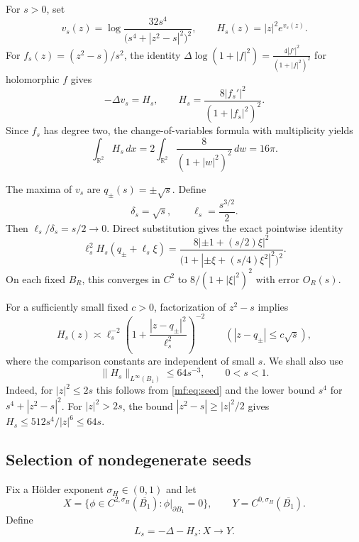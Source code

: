 \documentclass[11pt,reqno]{amsart}
\numberwithin{equation}{section}
\theoremstyle{definition}
\theoremstyle{remark}
\newcommand{\R}{\mathbb R}
\newcommand{\dd}{\,dx}
\begin{document}
For $s>0$, set
\begin{equation}\label{mf:eq:seed}
v_s(z)=\log\frac{32s^4}{\bigl(s^4+|z^2-s|^2\bigr)^2},
\qquad H_s(z)=|z|^2e^{v_s(z)}.
\end{equation}
For $f_s(z)=(z^2-s)/s^2$, the identity
\(\Delta\log(1+|f|^2)=\frac{4|f'|^2}{(1+|f|^2)^2}\)
for holomorphic $f$ gives
\begin{equation}\label{mf:eq:seedPDE}
-\Delta v_s=H_s,
\qquad H_s=\frac{8|f_s'|^2}{(1+|f_s|^2)^2}.
\end{equation}
Since $f_s$ has degree two, the change-of-variables formula with
multiplicity yields
\begin{equation}\label{mf:eq:totalmass}
\int_{\R^2}H_s\dd
=2\int_{\R^2}\frac8{(1+|w|^2)^2}\,dw=16\pi.
\end{equation}

The maxima of $v_s$ are $q_\pm(s)=\pm\sqrt{s}$. Define
\begin{equation}\label{mf:eq:scales}
\delta_s=\sqrt{s},\qquad \ell_s=\frac{s^{3/2}}2.
\end{equation}
Then $\ell_s/\delta_s=s/2\to0$. Direct substitution gives the exact
pointwise identity
\begin{equation}\label{mf:eq:exactcore}
\ell_s^2H_s(q_\pm+\ell_s\xi)
=\frac{8|\pm1+(s/2)\xi|^2}
{\bigl(1+|\pm\xi+(s/4)\xi^2|^2\bigr)^2}.
\end{equation}
On each fixed $B_R$, this converges in $C^2$ to
$8/(1+|\xi|^2)^2$ with error $O_R(s)$.

For a sufficiently small fixed $c>0$, factorization of $z^2-s$
implies
\begin{equation}\label{mf:eq:pointwise}
H_s(z)\asymp
\ell_s^{-2}\left(1+\frac{|z-q_\pm|^2}{\ell_s^2}\right)^{-2}
\qquad (|z-q_\pm|\le c\sqrt{s}),
\end{equation}
where the comparison constants are independent of small $s$.
We shall also use
\begin{equation}\label{mf:eq:supH}
\|H_s\|_{L^\infty(B_1)}\le64s^{-3},\qquad 0<s<1.
\end{equation}
Indeed, for $|z|^2\le2s$ this follows from \eqref{mf:eq:seed} and the
lower bound $s^4$ for $s^4+|z^2-s|^2$. For $|z|^2>2s$, the bound
$|z^2-s|\ge |z|^2/2$ gives $H_s\le512s^4/|z|^6\le64s$.

\subsection{Selection of nondegenerate seeds}

Fix a H\"older exponent $\sigma_H\in(0,1)$ and let
\[
X=\{\phi\in C^{2,\sigma_H}(\overline{B_1}):
\phi|_{\partial B_1}=0\},\qquad
Y=C^{0,\sigma_H}(\overline{B_1}).
\]
Define
\begin{equation}\label{mf:eq:linear}
L_s=-\Delta-H_s:X\longrightarrow Y.
\end{equation}
\end{document}

